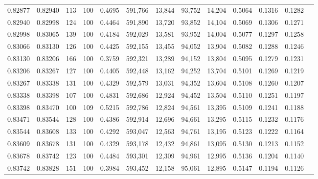 \begin{tabular}{rrrrrrrrrrrrr}
0.82877 & 0.82940 &   113 & 100 &                                     0.4695 & 591,766 &  13,844 &  93,752 &  14,204 & 0.5064 & 0.1316 & 0.1282 \\
0.82940 & 0.82998 &   124 & 100 &                                     0.4464 & 591,890 &  13,720 &  93,852 &  14,104 & 0.5069 & 0.1306 & 0.1271 \\
0.82998 & 0.83065 &   139 & 100 &                                     0.4184 & 592,029 &  13,581 &  93,952 &  14,004 & 0.5077 & 0.1297 & 0.1258 \\
0.83066 & 0.83130 &   126 & 100 &                                     0.4425 & 592,155 &  13,455 &  94,052 &  13,904 & 0.5082 & 0.1288 & 0.1246 \\
0.83130 & 0.83206 &   166 & 100 &                                     0.3759 & 592,321 &  13,289 &  94,152 &  13,804 & 0.5095 & 0.1279 & 0.1231 \\
0.83206 & 0.83267 &   127 & 100 &                                     0.4405 & 592,448 &  13,162 &  94,252 &  13,704 & 0.5101 & 0.1269 & 0.1219 \\
0.83267 & 0.83338 &   131 & 100 &                                     0.4329 & 592,579 &  13,031 &  94,352 &  13,604 & 0.5108 & 0.1260 & 0.1207 \\
0.83338 & 0.83398 &   107 & 100 &                                     0.4831 & 592,686 &  12,924 &  94,452 &  13,504 & 0.5110 & 0.1251 & 0.1197 \\
0.83398 & 0.83470 &   100 & 109 &                                     0.5215 & 592,786 &  12,824 &  94,561 &  13,395 & 0.5109 & 0.1241 & 0.1188 \\
0.83471 & 0.83544 &   128 & 100 &                                     0.4386 & 592,914 &  12,696 &  94,661 &  13,295 & 0.5115 & 0.1232 & 0.1176 \\
0.83544 & 0.83608 &   133 & 100 &                                     0.4292 & 593,047 &  12,563 &  94,761 &  13,195 & 0.5123 & 0.1222 & 0.1164 \\
0.83609 & 0.83678 &   131 & 100 &                                     0.4329 & 593,178 &  12,432 &  94,861 &  13,095 & 0.5130 & 0.1213 & 0.1152 \\
0.83678 & 0.83742 &   123 & 100 &                                     0.4484 & 593,301 &  12,309 &  94,961 &  12,995 & 0.5136 & 0.1204 & 0.1140 \\
0.83742 & 0.83828 &   151 & 100 &                                     0.3984 & 593,452 &  12,158 &  95,061 &  12,895 & 0.5147 & 0.1194 & 0.1126 \\

\end{tabular}

